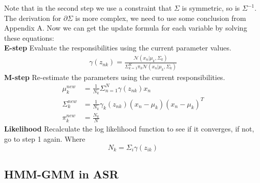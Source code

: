 \documentclass[11pt]{article}
\begin{document}
Note that in the second step we use a constraint that $\Sigma$ is symmetric, so is $\Sigma^{-1}$.\\
The derivation for $\partial \Sigma$ is more complex, we need to use some conclusion from Appendix A. Now we can get the update formula for each variable by solving these equations:\\
 \textbf{E-step} Evaluate the responsibilities using the current parameter values.
\begin{equation}
\begin{split}
\gamma (z_{nk}) = \frac{\mathcal{N}(x_n|\mu_k, \Sigma_k)}{\Sigma^K_{k=1}\pi_k\mathcal{N}(x_n|\mu_k,\Sigma_k)}
\end{split}
\end{equation}
\textbf{M-step} 
Re-estimate the parameters using the current responsibilities.
\begin{equation}
\begin{split}
\mu_k^{new}&=\frac{1}{N_k}{\Sigma^{N}_{n=1}\gamma(z_{nk})x_n}\\
\Sigma_k^{new}&=\frac{1}{N_k}\gamma_k(z_{nk})(x_n-\mu_k)(x_n-\mu_k)^T\\
\pi_k^{new}&=\frac{N_k}{N}
\end{split}
\end{equation}
\textbf{Likelihood} Recalculate the log likelihood function to see if it converges, if not, go to step 1 again.
Where
\begin{equation}
N_k=\Sigma_i\gamma(z_{ik})
\end{equation}

\subsection{HMM-GMM in ASR}
\end{document}
